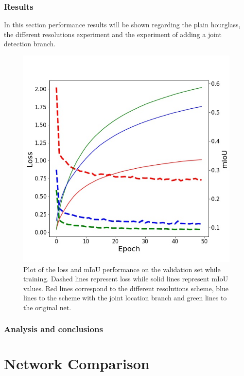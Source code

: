 \documentclass[12pt,a4paper]{article}
\begin{document}
\subsubsection{Results}

In this section performance results will be shown regarding the plain hourglass, the different resolutions experiment and the experiment of adding a joint detection branch.\\

\begin{figure}
\centering
\includegraphics[scale=0.5]{loss_plot_GTnormal.jpg}
\caption{Plot of the loss and mIoU performance on the validation set while training. Dashed lines represent loss while solid lines represent mIoU values. Red lines correspond to the different resolutions scheme, blue lines to the scheme with the joint location branch and green lines to the original net.}
\label{hourglass:resultsplot}
\end{figure}


\subsubsection{Analysis and conclusions}

\newpage
\section{Network Comparison}
\end{document}
